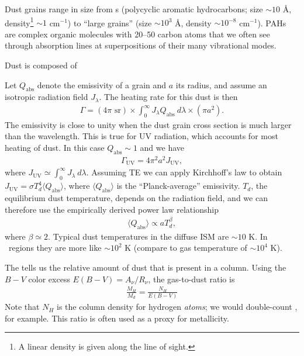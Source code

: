 Dust grains range in size from s (polycyclic aromatic hydrocarbons; size $\sim 10$ \r{A}, density\footnote{A linear density is given along the line of sight.} $\sim 1$ cm$^{-1}$) to ``large grains'' (size $\sim 10^3$ \r{A}, density $\sim 10^{-8}$ cm$^{-1}$). PAHs are complex organic molecules with 20--50 carbon atoms that we often see through absorption lines at superpositions of their many vibrational modes.

Dust is composed of

Let $Q_\text{abs}$ denote the emissivity of a grain and $a$ its radius, and assume an isotropic radiation field $J_\lambda$. The heating rate for this dust is then
\begin{align}
    \Gamma = (4\pi \text{ sr}) \times \int_0^\infty J_\lambda Q_\text{abs} \: d\lambda \times (\pi a^2).
\end{align}
The emissivity is close to unity when the dust grain cross section is much larger than the wavelength. This is true for UV radiation, which accounts for most heating of dust. In this case $Q_\text{abs} \sim 1$ and we have
\begin{align}
    \Gamma_\text{UV} = 4\pi^2 a^2 J_\text{UV},
\end{align}
where $J_\text{UV} \simeq \int_0^\infty J_\lambda \: d\lambda$. Assuming TE we can apply Kirchhoff's law to obtain $J_\text{UV} = \sigma T_d^4 \langle Q_\text{abs} \rangle$, where $\langle Q_\text{abs} \rangle$ is the ``Planck-average'' emissivity. $T_d$, the equilibrium dust temperature, depends on the radiation field, and we can therefore use the empirically derived power law relationship
\begin{align}
    \langle Q_\text{abs} \rangle \propto a T_d^\beta,
\end{align}
where $\beta \simeq 2$. Typical dust temperatures in the diffuse ISM are $\sim 10$ K. In \HII~regions they are more like $\sim 10^2$ K (compare to gas temperature of $\sim 10^4$ K).

The  tells us the relative amount of dust that is present in a column. Using the $B - V$ color excess $E(B - V) = A_\nu/R_\nu$, the gas-to-dust ratio is
\begin{align}
    \frac{M_H}{M_d} = \frac{N_H}{E(B - V)}
\end{align}
Note that $N_H$ is the column density for hydrogen \textit{atoms}; we would double-count , for example. This ratio is often used as a proxy for metallicity.


